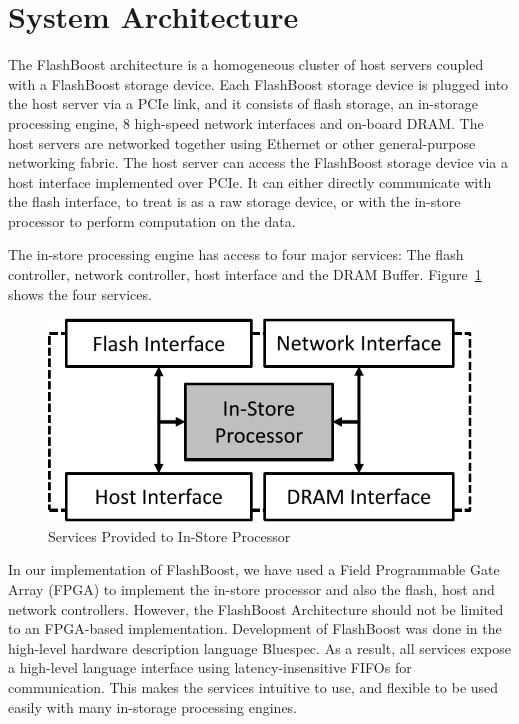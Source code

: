 \section{System Architecture}
\label{sec:architecture}

The FlashBoost architecture is a homogeneous cluster of host servers coupled
with a FlashBoost storage device. Each FlashBoost storage device is plugged into
the host server via a PCIe link, and it consists of flash storage, an in-storage
processing engine, 8 high-speed network interfaces and on-board DRAM. The host
servers are networked together using Ethernet or other general-purpose
networking fabric. The host server can access the FlashBoost storage device via
a host interface implemented over PCIe. It can either directly communicate with
the flash interface, to treat is as a raw storage device, or with the in-store
processor to perform computation on the data.

The in-store processing engine has access to four major services: The flash
controller, network controller, host interface and the DRAM Buffer.
Figure~\ref{fig:ispservice} shows the four services. 


\begin{figure}[h]
	\begin{center}
	\includegraphics[width=0.3\paperwidth]{figures/isp-service-crop.pdf}
	\caption{Services Provided to In-Store Processor}
	\label{fig:ispservice}
	\end{center}
\end{figure}

In our implementation of FlashBoost, we have used a Field Programmable Gate
Array (FPGA) to implement the in-store processor and also the flash, host and
network controllers. However, the FlashBoost Architecture should not be limited
to an FPGA-based implementation.  Development of FlashBoost was done in the
high-level hardware description language Bluespec. As a result, all services
expose a high-level language interface using latency-insensitive FIFOs for
communication. This makes the services intuitive to use, and flexible to be used
easily with many in-storage processing engines.


